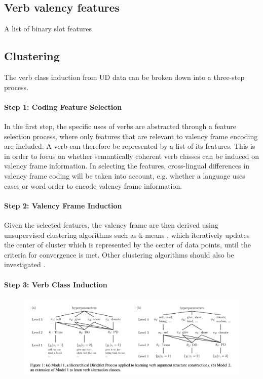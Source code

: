 \subsection{Verb valency features}\label{subsec:features}

A list of binary slot features



\subsection{Clustering}\label{subsec:clustering}

The verb class induction from UD data can be broken down into a three-step process. 

\paragraph{\textbf{Step 1: Coding Feature Selection}}
In the first step, the specific uses of verbs are abstracted through a feature selection process, where only features that are relevant to valency frame encoding are included. A verb can therefore be represented by a list of its features. This is in order to focus on whether semantically coherent verb classes can be induced on valency frame information. In selecting the features, cross-lingual differences in valency frame coding will be taken into account, e.g. whether a language uses cases or word order to encode valency frame information. 

\paragraph{\textbf{Step 2: Valency Frame Induction}}
Given the selected features, the valency frame are then derived using unsupervised clustering algorithms such as k-means \citep{macqueen1967}, which iteratively updates the center of cluster which is represented by the center of data points, until the criteria for convergence is met. Other clustering algorithms should also be investigated \citep{xu2015a}. 

\paragraph{\textbf{Step 3: Verb Class Induction}}

\begin{figure}
    \includegraphics[width=\textwidth]{figures/verb_alternation_classes.png}
    \centering    
\end{figure}

